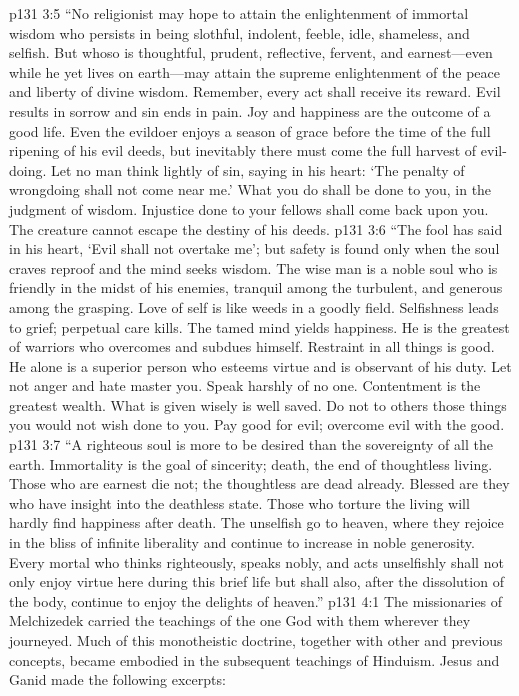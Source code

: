 \vs p131 3:5 “No religionist may hope to attain the enlightenment of immortal wisdom who persists in being slothful, indolent, feeble, idle, shameless, and selfish. But whoso is thoughtful, prudent, reflective, fervent, and earnest---even while he yet lives on earth---may attain the supreme enlightenment of the peace and liberty of divine wisdom. Remember, every act shall receive its reward. Evil results in sorrow and sin ends in pain. Joy and happiness are the outcome of a good life. Even the evildoer enjoys a season of grace before the time of the full ripening of his evil deeds, but inevitably there must come the full harvest of evil\hyp{}doing. Let no man think lightly of sin, saying in his heart: ‘The penalty of wrongdoing shall not come near me.’ What you do shall be done to you, in the judgment of wisdom. Injustice done to your fellows shall come back upon you. The creature cannot escape the destiny of his deeds.
\vs p131 3:6 “The fool has said in his heart, ‘Evil shall not overtake me’; but safety is found only when the soul craves reproof and the mind seeks wisdom. The wise man is a noble soul who is friendly in the midst of his enemies, tranquil among the turbulent, and generous among the grasping. Love of self is like weeds in a goodly field. Selfishness leads to grief; perpetual care kills. The tamed mind yields happiness. He is the greatest of warriors who overcomes and subdues himself. Restraint in all things is good. He alone is a superior person who esteems virtue and is observant of his duty. Let not anger and hate master you. Speak harshly of no one. Contentment is the greatest wealth. What is given wisely is well saved. Do not to others those things you would not wish done to you. Pay good for evil; overcome evil with the good.
\vs p131 3:7 “A righteous soul is more to be desired than the sovereignty of all the earth. Immortality is the goal of sincerity; death, the end of thoughtless living. Those who are earnest die not; the thoughtless are dead already. Blessed are they who have insight into the deathless state. Those who torture the living will hardly find happiness after death. The unselfish go to heaven, where they rejoice in the bliss of infinite liberality and continue to increase in noble generosity. Every mortal who thinks righteously, speaks nobly, and acts unselfishly shall not only enjoy virtue here during this brief life but shall also, after the dissolution of the body, continue to enjoy the delights of heaven.”
\vs p131 4:1 The missionaries of Melchizedek carried the teachings of the one God with them wherever they journeyed. Much of this monotheistic doctrine, together with other and previous concepts, became embodied in the subsequent teachings of Hinduism. Jesus and Ganid made the following excerpts:
